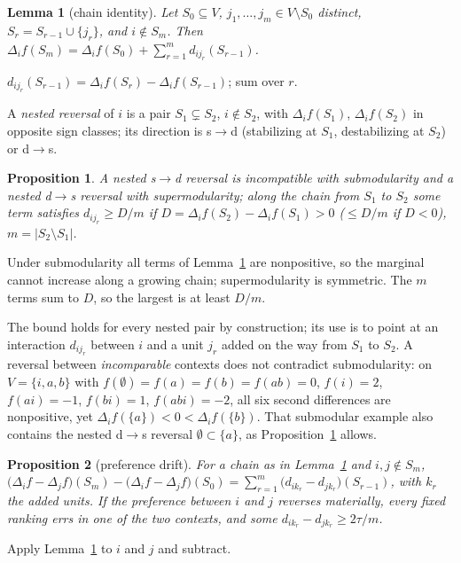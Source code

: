 \documentclass[journal]{IEEEtran}
\newtheorem{lemma}{Lemma}
\newtheorem{proposition}{Proposition}
\theoremstyle{remark}
\begin{document}
\begin{lemma}[chain identity]\label{lem:chain}
Let $S_0\subseteq V$, $j_1,\dots,j_m\in V\setminus S_0$ distinct,
$S_r=S_{r-1}\cup\{j_r\}$, and $i\notin S_m$. Then
$\Delta_if(S_m)=\Delta_if(S_0)+\sum_{r=1}^m d_{ij_r}(S_{r-1})$.
\end{lemma}
\begin{IEEEproof}
$d_{ij_r}(S_{r-1})=\Delta_if(S_r)-\Delta_if(S_{r-1})$; sum over $r$.
\end{IEEEproof}

A \emph{nested reversal} of $i$ is a pair $S_1\subsetneq S_2$, $i\notin S_2$,
with $\Delta_if(S_1)$, $\Delta_if(S_2)$ in opposite sign classes; its direction is
s$\to$d (stabilizing at $S_1$, destabilizing at $S_2$) or d$\to$s.

\begin{proposition}\label{prop:abc}
A nested s$\to$d reversal is incompatible with submodularity and a nested d$\to$s
reversal with supermodularity; along the chain from $S_1$ to $S_2$ some term
satisfies $d_{ij_r}\ge D/m$ if $D=\Delta_if(S_2)-\Delta_if(S_1)>0$ ($\le D/m$ if
$D<0$), $m=|S_2\setminus S_1|$.
\end{proposition}
\begin{IEEEproof}
Under submodularity all terms of Lemma~\ref{lem:chain} are nonpositive, so the
marginal cannot increase along a growing chain; supermodularity is symmetric. The
$m$ terms sum to $D$, so the largest is at least $D/m$.
\end{IEEEproof}

The bound holds for every nested pair by construction; its use is to point at an
interaction $d_{ij_r}$ between $i$ and a unit $j_r$ added on the way from $S_1$ to
$S_2$. A reversal between \emph{incomparable} contexts does not contradict
submodularity: on $V=\{i,a,b\}$ with $f(\emptyset)=f(a)=f(b)=f(ab)=0$, $f(i)=2$,
$f(ai)=-1$, $f(bi)=1$, $f(abi)=-2$, all six second differences are nonpositive,
yet $\Delta_if(\{a\})<0<\Delta_if(\{b\})$. That submodular example also contains the
nested d$\to$s reversal $\emptyset\subset\{a\}$, as Proposition~\ref{prop:abc}
allows.

\begin{proposition}[preference drift]\label{prop:drift}
For a chain as in Lemma~\ref{lem:chain} and $i,j\notin S_m$,
$\big(\Delta_if-\Delta_jf\big)(S_m)-\big(\Delta_if-\Delta_jf\big)(S_0)=
\sum_{r=1}^m\big(d_{ik_r}-d_{jk_r}\big)(S_{r-1})$, with $k_r$ the added units.
If the preference between $i$ and $j$ reverses materially, every fixed ranking
errs in one of the two contexts, and some $d_{ik_r}-d_{jk_r}\ge2\tau/m$.
\end{proposition}
\begin{IEEEproof}
Apply Lemma~\ref{lem:chain} to $i$ and $j$ and subtract.
\end{IEEEproof}
\end{document}
